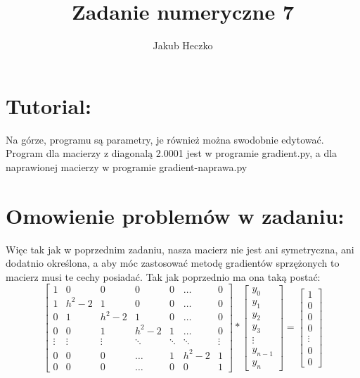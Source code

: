 \documentclass[12pt]{article}
\begin{document}
\title{{\Large}Zadanie numeryczne 7}
\date{}
\author{Jakub Heczko}

\maketitle

\section{Tutorial:}
Na górze, programu są parametry, je również można swodobnie edytować. Program dla macierzy z diagonalą 2.0001 jest w programie gradient.py, a dla naprawionej macierzy w programie gradient-naprawa.py
\section{Omowienie problemów w zadaniu:}
Więc tak jak w poprzednim zadaniu, nasza macierz nie jest ani symetryczna, ani dodatnio określona, a aby móc zastosować metodę gradientów sprzężonych to macierz musi te cechy posiadać. Tak jak poprzednio ma ona taką postać:
\[
\begin{bmatrix}
    1 & 0 & 0 & 0 & 0 & \dots & 0\\
    1 & h^{2}-2 & 1 & 0 & 0 & \dots & 0\\ 
    0 & 1 & h^{2}-2 & 1 & 0 & \dots & 0\\
    0 & 0 & 1 & h^{2}-2 & 1 &\dots & 0\\
    \vdots & \vdots & \vdots & \ddots & \ddots & \ddots & \vdots\\
    0 & 0 & 0 & \hdots & 1 & h^{2}-2 & 1\\
    0 & 0 & 0 & \hdots & 0 & 0 & 1
\end{bmatrix}
*
\begin{bmatrix}
    y_{0}\\
    y_{1}\\
    y_{2}\\
    y_{3}\\
    \vdots\\
    y_{n-1}\\
    y_{n}
\end{bmatrix}
=
\begin{bmatrix}
    1\\
    0\\
    0\\
    0\\
    \vdots\\
    0\\
    0
\end{bmatrix}
\]
\end{document}
